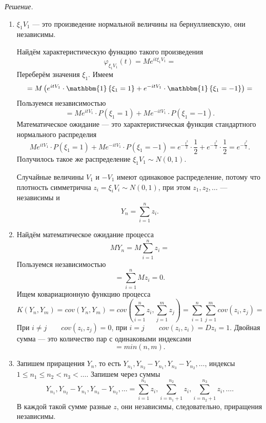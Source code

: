 \textit{Решение.}
\begin{enumerate}[label=\alph*)]
  \item $ \xi_1 V_1$ --- это произведение нормальной величины на бернуллиевскую, они независимы.

  Найдём характеристическую функцию такого произведения
  $$ \varphi_{ \xi_1 V_1} \left( t \right) =
    Me^{it \xi_1 V_1} =$$
  Переберём значения $ \xi_1$.
  Имеем
  $$= M \left(
    e^{itV_1} \cdot \mathbbm{1} \left\{ \xi_1 = 1 \right\} +
    e^{-itV_1} \cdot \mathbbm{1} \left\{ \xi_1 = -1 \right\} \right) =$$
  Пользуемся независимостью
  $$= Me^{itV_1} \cdot P \left( \xi_1 = 1 \right) + Me^{-itV_1} \cdot P \left( \xi_1 = -1 \right).$$
  Математическое ожидание --- это характеристическая функция стандартного нормального распределия
  $$Me^{itV_1} \cdot P \left( \xi_1 = 1 \right) + Me^{-itV_1} \cdot P \left( \xi_1 = -1 \right) =
    e^{-\frac{t^2}{2}} \cdot \frac{1}{2} + e^{-\frac{t^2}{2}} \cdot \frac{1}{2} =
    e^{-\frac{t^2}{2}}.$$
  Получилось такое же распределение $ \xi_1 V_1 \sim N \left( 0, 1 \right) $.

  Случайные величины $V_1$ и $-V_1$ имеют одинаковое распределение,
  потому что плотность симметрична $z_i = \xi_i V_i \sim N \left( 0, 1 \right) $,
  при этом $z_1, z_2, \dotsc $ --- независимы и
  $$Y_n =
    \sum \limits_{i = 1}^n z_i.$$
  \item Найдём математическое ожидание процесса
  $$MY_n =
    M \sum \limits_{i = 1}^n z_i =$$
  Пользуемся независимостью
  $$= \sum \limits_{i = 1}^n Mz_i =
    0.$$
  Ищем ковариационную функцию процесса
  $$K \left( Y_n, Y_m \right) =
    cov \left( Y_n, Y_m \right) =
    cov \left( \sum \limits_{i = 1}^n z_i, \sum \limits_{j = 1}^m z_j \right) =
    \sum \limits_{i = 1}^n \sum \limits_{j = 1}^m cov \left( z_i, z_j \right) =$$
  При $i \neq j \qquad cov \left( z_i, z_j \right) = 0$,
  при $i = j \qquad cov \left( z_i, z_i \right) = Dz_i = 1$.
  Двойная сумма --- это количество пар с одинаковыми индексами
  $$= min \left( n, m \right).$$
  \item Запишем приращения $Y_n$, то есть $Y_{n_1}, Y_{n_2} - Y_{n_1}, Y_{n_3} - Y_{n_2}, \dotsc $,
  индексы $1 \leq n_1 \leq n_2 < n_3 < \dotsc $.
  Запишем через суммы
  $$Y_{n_1}, Y_{n_2} - Y_{n_1}, Y_{n_3} - Y_{n_2}, \dotsc  =
    \sum \limits_{i = 1}^{n_1} z_i,
    \sum \limits_{i = n_1 + 1}^{n_2} z_i,
    \sum \limits_{i = n_2 + 1}^{n_3} z_i, \dotsc.$$
  В каждой такой сумме разные $z$, они независимы, следовательно, приращения независимы.


\end{enumerate}
